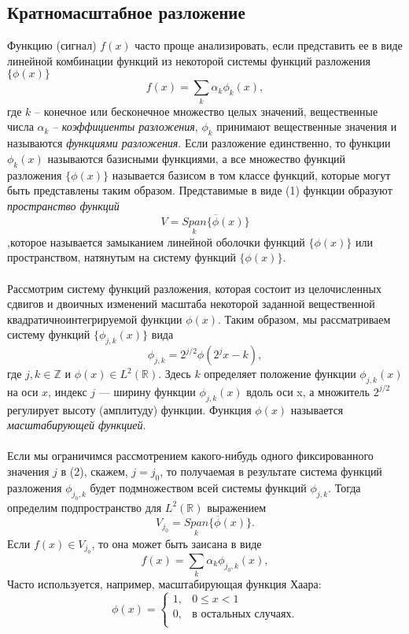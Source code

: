\documentclass[12pt]{article}
\begin{document}
\subsection*{Кратномасштабное разложение}
Функцию (сигнал) $f(x)$ часто проще анализировать, если представить ее в виде
линейной комбинации функций из некоторой системы функций разложения $\{\phi(x)\}$
\[
f(x) = \sum_k \alpha_k \phi_k(x), \tag{1}
\]
где $k$ -- конечное или бесконечное множество целых значений, вещественные числа $\alpha_k$ -- \textit{коэффициенты разложения}, $\phi_k$ принимают вещественные значения и называются \textit{функциями разложения}. Если разложение единственно, то функции $\phi_k(x)$ называются базисными функциями, а все множество функций разложения $\{\phi(x)\}$ называется базисом в том классе функций, которые могут быть представлены таким образом. Представимые в виде (1) функции образуют \textit{пространство функций}
$$V = \overline{\underset{k}{Span}\{\phi(x)\}}$$
,которое называется замыканием линейной оболочки функций $\{\phi(x)\}$ или пространством, натянутым на систему
функций $\{\phi(x)\}$.\\
\\
Рассмотрим систему функций разложения, которая состоит из целочисленных сдвигов и двоичных изменений масштаба некоторой заданной вещественной квадратичноинтегрируемой функции $\phi(x)$. Таким образом, мы рассматриваем систему функций $\{\phi_{j,k}(x)\}$ вида
\[
\phi_{j,k} = 2^{j/2}\phi(2^j x - k), \tag{2}
\]
где $j,k \in \mathbb{Z}$ и $\phi(x) \in L^2(\mathbb{R})$. Здесь $k$ определяет положение функции $\phi_{j,k}(x)$ на оси $x$, индекс $j$ — ширину функции $\phi_{j,k}(x)$ вдоль оси x, а множитель $ 2^{j/2}$ регулирует высоту (амплитуду) функции. Функция $\phi(x)$ называется \textit{масштабирующей функцией}.\\
\\
Если мы ограничимся рассмотрением какого-нибудь одного фиксированного значения $j$ в (2), скажем, $j = j_0$, то получаемая в результате система функций разложения $\phi_{j_0,k}$ будет подмножеством всей системы функций $\phi_{j,k}$. Тогда определим подпространство для $L^2(\mathbb{R})$ выражением
\[
V_{j_0} = \overline{\underset{k}{Span}\{\phi(x)\}}. \tag{3}
\]
Если $f(x) \in V_{j_0}$, то она может быть заисана в виде
\[
f(x) = \sum_k \alpha_k \phi_{j_0,k}(x), \tag{4}
\]
Часто используется, например, масштабирующая функция Хаара:\\
\[
\phi(x) = 
\begin{cases}
1,    & 0 \leq x < 1\\
0,    & \text{в остальных случаях.}\\
\end{cases}
\tag{5}
\]
\end{document}
